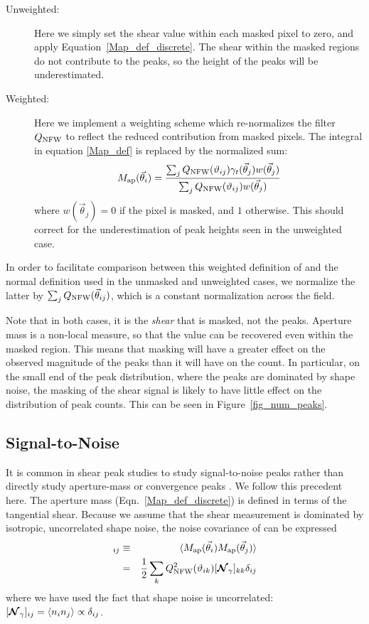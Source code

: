 \begin{description}
  \item[Unweighted:] Here we simply set the shear value within each 
    masked pixel to zero, and apply Equation~\ref{Map_def_discrete}.  
    The shear within the masked regions do not contribute to the peaks, so the
    height of the peaks will be underestimated.
  \item[Weighted:] Here we implement a weighting scheme which
    re-normalizes the filter $Q_{\rm NFW}$ to reflect the
    reduced contribution from masked pixels.  The integral in 
    equation \ref{Map_def} is replaced by the normalized sum:
    \begin{equation}
      M_{\rm ap}(\vec\theta_i) 
      = \frac{\sum_j 
        Q_{\rm NFW}(\vartheta_{ij})
        \gamma_t(\vec\theta_j)w(\vec\theta_j)}
      {\sum_j 
        Q_{\rm NFW}(\vartheta_{ij})w(\vec\theta_j)}
    \end{equation}
    where $w(\vec\theta_j) = 0$ if the pixel is masked, and 
    $1$ otherwise.  This should correct for the underestimation of peak
    heights seen in the unweighted case.
\end{description}
In order to facilitate comparison between this weighted definition of \Map 
and the normal definition used in the unmasked and unweighted cases, 
we normalize the latter by $\sum_j Q_{\rm NFW}(\vec\theta_{ij})$, 
which is a constant normalization across the field.

Note that in both cases, it is the \textit{shear} that is masked, not the
\Map peaks.  Aperture mass is a non-local measure, so that the value can
be recovered even within the masked region.  This means that
masking will have a greater effect on the observed magnitude of the peaks
than it will have on the count.  In particular, on the small end of the
peak distribution, where the peaks are dominated by shape noise, the
masking of the shear signal is likely to have little effect on the
distribution of peak counts.  This can be seen in Figure~\ref{fig_num_peaks}.

\subsection{\Map Signal-to-Noise}
It is common in shear peak studies to study signal-to-noise peaks 
rather than directly study aperture-mass or convergence
peaks \citep[e.g.~][]{Wang09,Dietrich10,Schmidt10}.
We follow this precedent here.  
The aperture mass (Eqn.~\ref{Map_def_discrete}) is defined in terms of the
tangential shear.  Because we assume that the shear measurement is dominated
by isotropic, uncorrelated shape noise, the noise covariance of 
\Map can be expressed
\begin{eqnarray}
  [\Noise_M]_{ij} &\equiv& \langle M_{\rm ap}(\vec\theta_i) 
  M_{\rm ap}(\vec\theta_j)\rangle  \nonumber\\
  & = & \frac{1}{2}\sum_{k}
  Q^2_{\rm NFW}(\vartheta_{ik}) [\Noise_\gamma]_{kk} \delta_{ij}
\end{eqnarray}
where we have used the fact that shape noise is uncorrelated:
$[\boldsymbol{\mathcal{N}}_\gamma]_{ij} = \langle n_i n_j\rangle \propto \delta_{ij}$.

